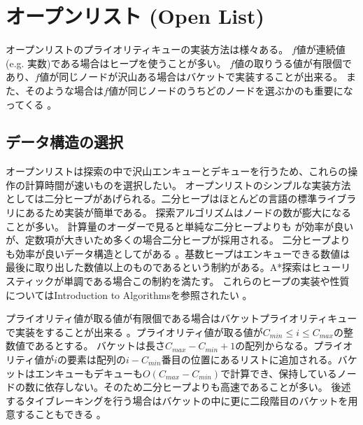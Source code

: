 


\section{オープンリスト (Open List)}
\label{sec:open-list}
オープンリストのプライオリティキューの実装方法は様々ある。
$f$値が連続値 (e.g. 実数)である場合はヒープを使うことが多い。
$f$値の取りうる値が有限個であり、$f$値が同じノードが沢山ある場合はバケットで実装することが出来る。
また、そのような場合は$f$値が同じノードのうちどのノードを選ぶかのも重要になってくる \cite{asai2016tiebreaking}。


\subsection{データ構造の選択}
\label{sec:priority-queue}

オープンリストは探索の中で沢山エンキューとデキューを行うため、これらの操作の計算時間が速いものを選択したい。
オープンリストのシンプルな実装方法としては二分ヒープがあげられる。二分ヒープはほとんどの言語の標準ライブラリにあるため実装が簡単である。
探索アルゴリズムはノードの数が膨大になることが多い。
計算量のオーダーで見ると単純な二分ヒープよりも \cite{fredman1987fibonacci}が効率が良いが、定数項が大きいため多くの場合二分ヒープが採用される。
二分ヒープよりも効率が良いデータ構造としてがある \cite{ahuja1990faster}。基数ヒープはエンキューできる数値は最後に取り出した数値以上のものであるという制約がある。A*探索はヒューリスティックが単調である場合この制約を満たす。
これらのヒープの実装や性質についてはIntroduction to Algorithmsを参照されたい \cite{cormen01}。

プライオリティ値が取る値が有限個である場合はバケットプライオリティキュー \cite{dial1969algorithm} で実装をすることが出来る \cite{burns2012implementing}。プライオリティ値が取る値が$C_{min} \leq i \leq C_{max}$の整数値であるとする。
バケットは長さ$C_{max} - C_{min} + 1$の配列からなる。プライオリティ値が$i$の要素は配列の$i - C_{min}$番目の位置にあるリストに追加される。バケットはエンキューもデキューも$O(C_{max} - C_{min})$で計算でき、保持しているノードの数に依存しない。そのため二分ヒープよりも高速であることが多い。
後述するタイブレーキングを行う場合はバケットの中に更に二段階目のバケットを用意することもできる \cite{burns2012implementing}。

